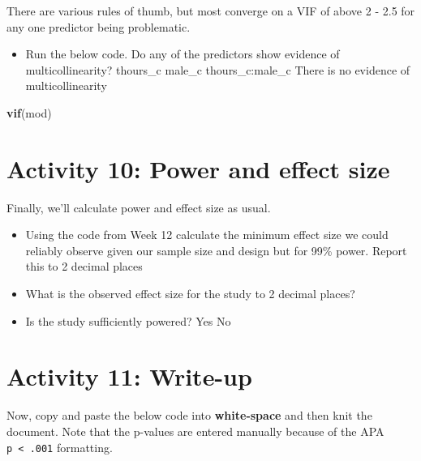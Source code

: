 \documentclass[]{book}
\newenvironment{Shaded}{\begin{snugshade}}{\end{snugshade}}
\newcommand{\KeywordTok}[1]{\textcolor[rgb]{0.13,0.29,0.53}{\textbf{#1}}}
\newcommand{\NormalTok}[1]{#1}
\providecommand{\tightlist}{%
  \setlength{\itemsep}{0pt}\setlength{\parskip}{0pt}}
\begin{document}
There are various rules of thumb, but most converge on a VIF of above 2 - 2.5 for any one predictor being problematic.

\begin{itemize}
\tightlist
\item
  Run the below code. Do any of the predictors show evidence of multicollinearity? thours\_c male\_c thours\_c:male\_c There is no evidence of multicollinearity
\end{itemize}

\begin{Shaded}
\begin{Highlighting}[]
\KeywordTok{vif}\NormalTok{(mod)}
\end{Highlighting}
\end{Shaded}

\hypertarget{activity-10-power-and-effect-size}{%
\section{Activity 10: Power and effect size}\label{activity-10-power-and-effect-size}}

Finally, we'll calculate power and effect size as usual.

\begin{itemize}
\item
  Using the code from Week 12 calculate the minimum effect size we could reliably observe given our sample size and design but for 99\% power. Report this to 2 decimal places 
\item
  What is the observed effect size for the study to 2 decimal places? \\
\item
  Is the study sufficiently powered? Yes No
\end{itemize}

\hypertarget{activity-11-write-up-1}{%
\section{Activity 11: Write-up}\label{activity-11-write-up-1}}

Now, copy and paste the below code into \textbf{white-space} and then knit the document. Note that the p-values are entered manually because of the APA \texttt{p\ \textless{}\ .001} formatting.
\end{document}
